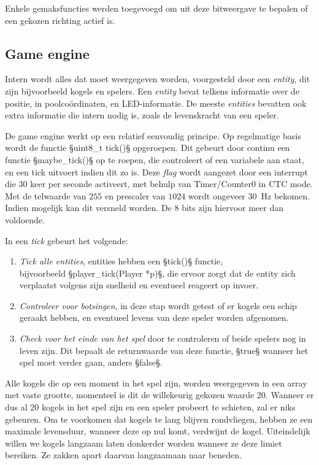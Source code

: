 \documentclass[12pt]{ugentreport}
\begin{document}
Enkele gemaksfuncties werden toegevoegd om uit deze bitweergave te bepalen of
een gekozen richting actief is.

\subsection{Game engine}
Intern wordt alles dat moet weergegeven worden, voorgesteld door een
\emph{entity}, dit zijn bijvoorbeeld kogels en spelers. Een \emph{entity} bevat
telkens informatie over de positie, in poolcoördinaten, en LED-informatie. De
meeste \emph{entities} bevatten ook extra informatie die intern nodig is, zoals
de levenskracht van een speler.

De game engine werkt op een relatief eenvoudig principe.
Op regelmatige basis wordt de functie §uint8_t tick()§
opgeroepen. Dit gebeurt door continu een functie §maybe_tick()§ op te roepen,
die controleert of een variabele aan staat, en een tick uitvoert indien dit zo
is. Deze \emph{flag} wordt aangezet door een interrupt die 30 keer per seconde
activeert, met behulp van Timer/Counter0 in CTC mode. Met de telwaarde van $255$
en prescaler van $1024$ wordt ongeveer \SI{30}{\hertz} bekomen. Indien mogelijk
kan dit versneld worden. De 8 bits zijn hiervoor meer dan voldoende.

In een \emph{tick} gebeurt het volgende:
\begin{enumerate}
\item \emph{Tick alle entities}, entities hebben een §tick()§ functie,\\
  bijvoorbeeld §player_tick(Player *p)§, die ervoor zorgt dat de entity zich
  verplaatst volgens zijn snelheid en eventueel reageert op invoer.

\item \emph{Controleer voor botsingen}, in deze stap wordt getest of er
  kogels een schip geraakt hebben, en eventueel levens van deze speler worden
  afgenomen.

\item \emph{Check voor het einde van het spel} door te controleren of beide
  spelers nog in leven zijn. Dit bepaalt de returnwaarde van deze functie,
  §true§ wanneer het spel moet verder gaan, anders §false§.
\end{enumerate}

Alle kogels die op een moment in het spel zijn, worden weergegeven in een array
met vaste grootte, momenteel is dit de willekeurig gekozen waarde 20. Wanneer
er dus al 20 kogels in het spel zijn en een speler probeert te schieten, zal er
niks gebeuren. Om te voorkomen
dat kogels te lang blijven rondvliegen, hebben ze een maximale levensduur,
wanneer deze op nul komt, verdwijnt de kogel. Uiteindelijk willen we kogels
langzaam laten donkerder worden wanneer ze deze limiet bereiken. Ze zakken apart
daarvan langzaamaan naar beneden.
\end{document}
